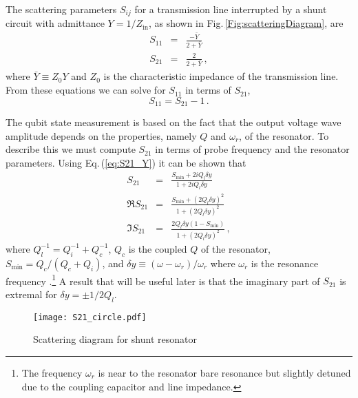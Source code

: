 The scattering parameters $S_{ij}$ for a transmission line interrupted by a shunt circuit with admittance $Y=1/Z_{\text{in}}$, as shown in Fig.\,\ref{Fig:scatteringDiagram}, are \cite{Pozar:microwaveEngineering2009} \begin{eqnarray}
S_{11} &=& \frac{-\bar{Y}}{2+\bar{Y}} \label{eq:S11_Y} \\
S_{21} &=& \frac{2}{2+\bar{Y}} \, , \label{eq:S21_Y} \end{eqnarray}
where $\bar{Y} \equiv Z_0 Y$ and $Z_0$ is the characteristic impedance of the transmission line.
From these equations we can solve for $S_{11}$ in terms of $S_{21}$, \begin{equation}
S_{11} = S_{21} - 1 \, . \label{eq:S11S21} \end{equation}

The qubit state measurement is based on the fact that the output voltage wave amplitude depends on the properties, namely $Q$ and $\omega_r$, of the resonator.
To describe this we must compute $S_{21}$ in terms of probe frequency and the resonator parameters.
Using Eq.\,(\ref{eq:S21_Y}) it can be shown that \begin{eqnarray}
S_{21} &=& \frac{S_{\textrm{min}} + 2iQ_l \delta y}{1+2iQ_l \delta y} \label{eq:S21} \\
\Re S_{21} &=& \frac{S_{\textrm{min}}+(2Q_l\delta y)^2}{1+(2Q_l\delta y)^2} \\
\Im S_{21} &=& \frac{2Q_l\delta y(1-S_{\textrm{min}})}{1+(2Q_l\delta y)^2} \, , \end{eqnarray}
where $Q_l^{-1} = Q_i^{-1} + Q_c^{-1}$, $Q_c$ is the coupled $Q$ of the resonator, $S_{\textrm{min}} = Q_c/(Q_c + Q_i)$, and $\delta y \equiv (\omega - \omega_r) / \omega_r$ where $\omega_r$ is the resonance frequency \cite{Mazin:thesis2004}.\footnote{The frequency $\omega_r$ is near to the resonator bare resonance but slightly detuned due to the coupling capacitor and line impedance.}
A result that will be useful later is that the imaginary part of $S_{21}$ is extremal for $\delta y = \pm 1/2Q_l$.

\begin{figure}
\begin{centering}
\texttt{[image: S21\_circle.pdf]} 
\par\end{centering}
\caption{Scattering diagram for shunt resonator}
\label{Fig:S21Circle}
\end{figure}

